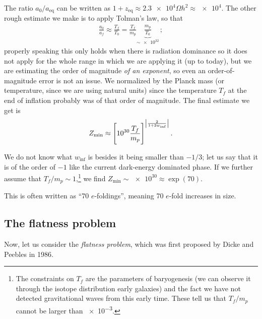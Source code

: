 \documentclass[main.tex]{subfiles}
\begin{document}
The ratio \(a_0 / a _{\text{eq}}\) can be written as \(1 + z _{\text{eq}} \approx \num{2.3e4} \Omega h^2 \approx \num{e4}\).
The other rough estimate we make is to apply Tolman's law, so that 
%
\begin{align}
\frac{a_0 }{a_f} \approx \frac{T_f}{T_0 } = \frac{T_f}{m_p} \underbrace{\frac{m_p}{T_0 }}_{\sim \num{e32}}
\,;
\end{align}
%
properly speaking this only holds when there is radiation dominance so it does not apply for the whole range in which we are applying it (up to today), but we are estimating the order of magnitude \emph{of an exponent}, so even an order-of-magnitude error is not an issue.
We normalized by the Planck mass (or temperature, since we are using natural units) since the temperature \(T_f\) at the end of inflation probably was of that order of magnitude. 
The final estimate we get is 
%
\begin{align}
Z _{\text{min}} \approx \qty[\num{e30} \frac{T_f}{m_p}]^{\abs{ \frac{2}{1 + 3 w _{\text{inf}}}}}
\,.
\end{align}

We do not know what \(w _{\text{inf}}\) is besides it being smaller than \(- 1/3\); let us say that it is of the order of \(-1\) like the current dark-energy dominated phase.
If we further assume that \(T_f / m_p \sim 1\),\footnote{The constraints on \(T_f\) are the parameters of baryogenesis (we can observe it through the isotope distribution early galaxies) and the fact we have not detected gravitational waves from this early time. These tell us that \(T_f / m_p\) cannot be larger than \num{e-3}.} we find \(Z _{\text{min}} \sim \num{e30} \approx \exp(70)\). 

This is often written as ``70 \(e\)-foldings'', meaning 70 \(e\)-fold increases in size. 
 


\subsection{The flatness problem}

Now, let us consider the \emph{flatness problem}, which was first proposed by Dicke and Peebles in 1986.


\end{document}
